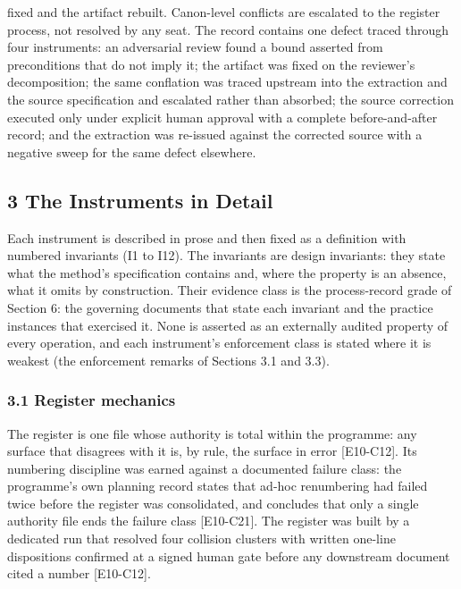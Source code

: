 \documentclass[
  11pt,
]{article}
\begin{document}
\begin{itemize}
  fixed and the artifact rebuilt. Canon-level conflicts are escalated to
  the register process, not resolved by any seat. The record contains
  one defect traced through four instruments: an adversarial review
  found a bound asserted from preconditions that do not imply it; the
  artifact was fixed on the reviewer's decomposition; the same
  conflation was traced upstream into the extraction and the source
  specification and escalated rather than absorbed; the source
  correction executed only under explicit human approval with a complete
  before-and-after record; and the extraction was re-issued against the
  corrected source with a negative sweep for the same defect elsewhere.
\end{itemize}

\subsection{3 The Instruments in
Detail}\label{the-instruments-in-detail}

Each instrument is described in prose and then fixed as a definition
with numbered invariants (I1 to I12). The invariants are design
invariants: they state what the method's specification contains and,
where the property is an absence, what it omits by construction. Their
evidence class is the process-record grade of Section 6: the governing
documents that state each invariant and the practice instances that
exercised it. None is asserted as an externally audited property of
every operation, and each instrument's enforcement class is stated where
it is weakest (the enforcement remarks of Sections 3.1 and 3.3).

\subsubsection{3.1 Register mechanics}\label{register-mechanics}

The register is one file whose authority is total within the programme:
any surface that disagrees with it is, by rule, the surface in error
{[}E10-C12{]}. Its numbering discipline was earned against a documented
failure class: the programme's own planning record states that ad-hoc
renumbering had failed twice before the register was consolidated, and
concludes that only a single authority file ends the failure class
{[}E10-C21{]}. The register was built by a dedicated run that resolved
four collision clusters with written one-line dispositions confirmed at
a signed human gate before any downstream document cited a number
{[}E10-C12{]}.
\end{document}
